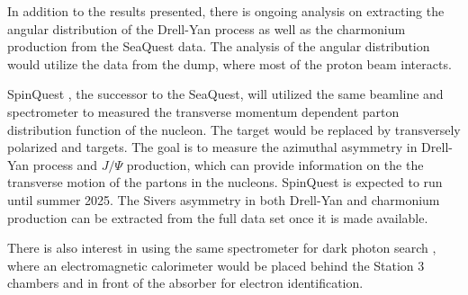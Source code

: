 \documentclass[../main.tex]{subfiles}
\begin{document}
In addition to the results presented, there is ongoing analysis on extracting
the angular distribution of the Drell-Yan process as well as the charmonium
production from the SeaQuest data. The analysis of the angular distribution would
utilize the data from the dump, where most of the proton beam interacts.

SpinQuest \cite{geesaman2014}, the successor to the SeaQuest, will utilized the same beamline and
spectrometer to measured the transverse momentum dependent parton distribution
function of the nucleon. The target would be replaced by transversely polarized 
and  targets. The goal is to measure the azimuthal asymmetry in
Drell-Yan process and $J/\Psi$ production, which can provide information on the
the transverse motion of the partons in the nucleons.
SpinQuest is expected to run until summer 2025. The Sivers
asymmetry in both Drell-Yan and charmonium production can be extracted from the full
data set once it is made available.

There is also interest in using the same spectrometer for dark photon search
\cite{apyan2022}, where an electromagnetic calorimeter would be placed behind the
Station 3 chambers and in front of the absorber for electron identification.

\ifSubfilesClassLoaded{ \printbibliography[heading=bibintoc,title={References}]}{}
\end{document}
